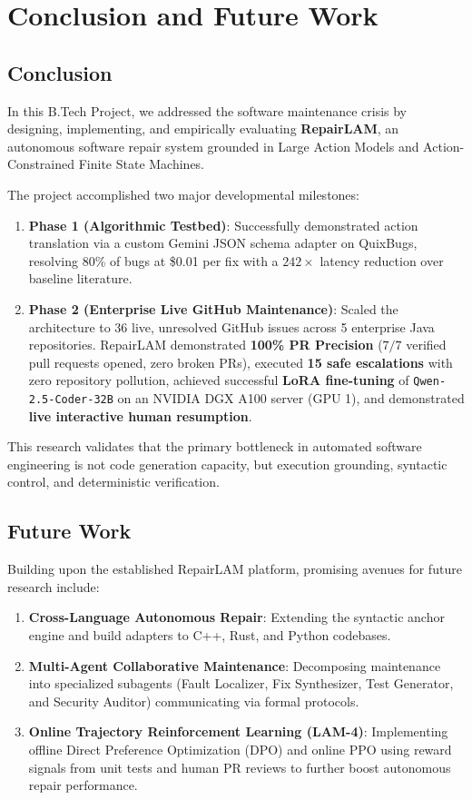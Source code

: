 \documentclass[12pt,a4paper]{report}
\begin{document}
\newpage
\chapter{Conclusion and Future Work}

\section{Conclusion}
In this B.Tech Project, we addressed the software maintenance crisis by designing, implementing, and empirically evaluating \textbf{RepairLAM}, an autonomous software repair system grounded in Large Action Models and Action-Constrained Finite State Machines.

The project accomplished two major developmental milestones:
\begin{enumerate}
    \item \textbf{Phase 1 (Algorithmic Testbed)}: Successfully demonstrated action translation via a custom Gemini JSON schema adapter on QuixBugs, resolving 80\% of bugs at \$0.01 per fix with a $242\times$ latency reduction over baseline literature.
    \item \textbf{Phase 2 (Enterprise Live GitHub Maintenance)}: Scaled the architecture to 36 live, unresolved GitHub issues across 5 enterprise Java repositories. RepairLAM demonstrated \textbf{100\% PR Precision} ($7/7$ verified pull requests opened, zero broken PRs), executed \textbf{15 safe escalations} with zero repository pollution, achieved successful \textbf{LoRA fine-tuning} of \texttt{Qwen-2.5-Coder-32B} on an NVIDIA DGX A100 server (GPU 1), and demonstrated \textbf{live interactive human resumption}.
\end{enumerate}

This research validates that the primary bottleneck in automated software engineering is not code generation capacity, but execution grounding, syntactic control, and deterministic verification.

\section{Future Work}
Building upon the established RepairLAM platform, promising avenues for future research include:
\begin{enumerate}
    \item \textbf{Cross-Language Autonomous Repair}: Extending the syntactic anchor engine and build adapters to C++, Rust, and Python codebases.
    \item \textbf{Multi-Agent Collaborative Maintenance}: Decomposing maintenance into specialized subagents (Fault Localizer, Fix Synthesizer, Test Generator, and Security Auditor) communicating via formal protocols.
    \item \textbf{Online Trajectory Reinforcement Learning (LAM-4)}: Implementing offline Direct Preference Optimization (DPO) and online PPO using reward signals from unit tests and human PR reviews to further boost autonomous repair performance.
\end{enumerate}
\end{document}
